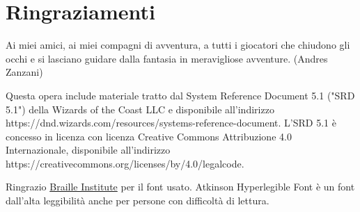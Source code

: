 \section{Ringraziamenti}

\begin{changemargin}{0.3cm}{0.3cm}\begin{enfasi}{
			\begin{center}
Ai miei amici, ai miei compagni di avventura, a tutti i giocatori che chiudono gli occhi e si lasciano guidare dalla fantasia in meravigliose avventure. (Andres Zanzani)
			\end{center}
}\end{enfasi}\end{changemargin}

\medskip

Questa opera include materiale tratto dal System Reference Document 5.1 ("SRD 5.1") della Wizards of the Coast LLC e disponibile all'indirizzo https://dnd.wizards.com/resources/systems-reference-document. L'SRD 5.1 è concesso in licenza con licenza Creative Commons Attribuzione 4.0 Internazionale, disponibile all'indirizzo https://creativecommons.org/licenses/by/4.0/legalcode.


\medskip


Ringrazio \href{https://www.brailleinstitute.org/freefont/}{Braille Institute} per il font usato. Atkinson Hyperlegible Font è un font dall'alta leggibilità anche per persone con difficoltà di lettura.

